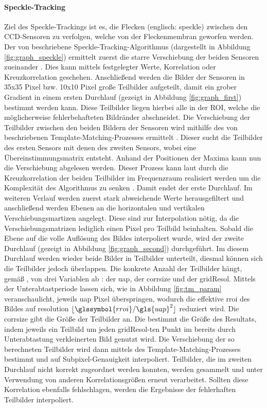 \paragraph{Speckle-Tracking}
\label{sec:speckle-tracking}
Ziel des Speckle-Trackings ist es, die Flecken (englisch: speckle) zwischen den \gls{CCD}-Sensoren zu verfolgen, welche von der Fleckenmembran geworfen werden. Der von \citeauthor{Ber13} beschriebene Speckle-Tracking-Algorithmus (dargestellt in Abbildung \ref{fig:graph_speckle}) ermittelt zuerst die starre Verschiebung der beiden Sensoren zueinander . Dies kann mittels festgelegter Werte, Korrelation oder Kreuzkorrelation geschehen. Anschließend werden die Bilder der Sensoren in 35x35 Pixel bzw. 10x10 Pixel große Teilbilder aufgeteilt, damit ein grober Gradient in einem ersten Durchlauf (gezeigt in Abbildung \ref{fig:graph_first}) bestimmt werden kann. Diese Teilbilder liegen hierbei alle in der \gls{ROI}, welche die möglicherweise fehlerbehafteten Bildränder abschneidet. Die Verschiebung der Teilbilder zwischen den beiden Bildern der Sensoren wird mithilfe des von \citeauthor{Lew94} beschriebenen Template-Matching-Prozesses ermittelt \cite{Lew94}. Dieser sucht die Teilbilder des ersten Sensors mit denen des zweiten Sensors, wobei eine Übereinstimmungsmatrix entsteht. Anhand der Positionen der Maxima kann nun die Verschiebung abgelesen werden. Dieser Prozess kann laut \citeauthor{Lew94} durch die Kreuzkorrelation der beiden Teilbilder im Frequenzraum realisiert werden um die Komplexität des Algorithmus zu senken \cite{Lew94}. Damit endet der erste Durchlauf. Im weiteren Verlauf werden zuerst stark abweichende Werte herausgefiltert und anschließend werden Ebenen an die horizontalen und vertikalen Verschiebungsmartizen angelegt. Diese sind zur Interpolation nötig, da die Verschiebungsmatrizen lediglich einen Pixel pro Teilbild beinhalten. Sobald die Ebene auf die volle Auflösung des Bildes interpoliert wurde, wird der zweite Durchlauf (gezeigt in Abbildung \ref{fig:graph_second}) durchgeführt. Im diesem Durchlauf werden wieder beide Bilder in Teilbilder unterteilt, diesmal können sich die Teilbilder jedoch überlappen. Die konkrete Anzahl der Teilbilder hängt, gemäß \citeauthor{Coj17}, von drei Variablen ab \cite{Coj17}: der \gls{uap}, der \gls{corrsize} und der \gls{gridResol}. Mittels der Unterabtastperiode lassen sich, wie in Abbildung \ref{fig:tm_param} veranschaulicht, jeweils \gls{uap} Pixel überspringen, wodurch die effektive \gls{rroi} des Bildes auf \glsdesc{resolution} $\lfloor\glssymbol{rroi}/\gls{uap}^2\rfloor$ reduziert wird. Die  \gls{corrsize} gibt die Größe der Teilbilder an. Die  bestimmt die Größe des Resultats, indem jeweils ein Teilbild um jeden \gls{gridResol}-ten Punkt im bereits durch Unterabtastung verkleinerten Bild genutzt wird. Die Verschiebung der so berechneten Teilbilder wird dann mittels des Template-Matching-Prozesses bestimmt und auf Subpixel-Genauigkeit interpoliert. Teilbilder, die im zweiten Durchlauf nicht korrekt zugeordnet werden konnten, werden gesammelt und unter Verwendung von anderen Korrelationsgrößen erneut verarbeitet. Sollten diese Korrelation ebenfalls fehlschlagen, werden die Ergebnisse der fehlerhaften Teilbilder interpoliert. 

